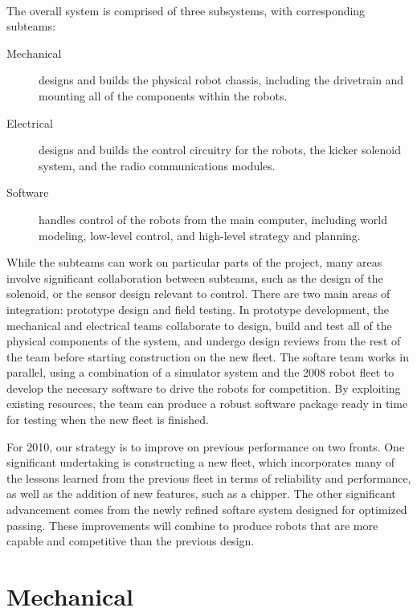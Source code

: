 \documentclass{llncs}
\begin{document}
\paragraph{}
The overall system is comprised of three subsystems, with corresponding subteams:
\begin{description}
 \item[Mechanical] designs and builds the physical robot chassis, including the drivetrain and mounting all of the components within the robots.
 \item[Electrical] designs and builds the control circuitry for the robots, the kicker solenoid system, and the radio communications modules.
 \item[Software] handles control of the robots from the main computer, including world modeling, low-level control, and high-level strategy and planning. 
\end{description}
While the subteams can work on particular parts of the project, many areas involve significant collaboration between subteams, such as the design of the solenoid, or the sensor design relevant to control. There are two main areas of integration: prototype design and field testing.  In prototype development, the mechanical and electrical teams collaborate to design, build and test all of the physical components of the system, and undergo design reviews from the rest of the team before starting construction on the new fleet.  The softare team works in parallel, using a combination of a simulator system and the 2008 robot fleet to develop the necesary software to drive the robots for competition. By exploiting existing resources, the team can produce a robust software package ready in time for testing when the new fleet is finished.  

For 2010, our strategy is to improve on previous performance on two fronts.  One significant undertaking is constructing a new fleet, which incorporates many of the lessons learned from the previous fleet in terms of reliability and performance, as well as the addition of new features, such as a chipper.  The other significant advancement comes from the newly refined softare system designed for optimized passing.  These improvements will combine to produce robots that are more capable and competitive than the previous design.



\section{Mechanical}
\end{document}
